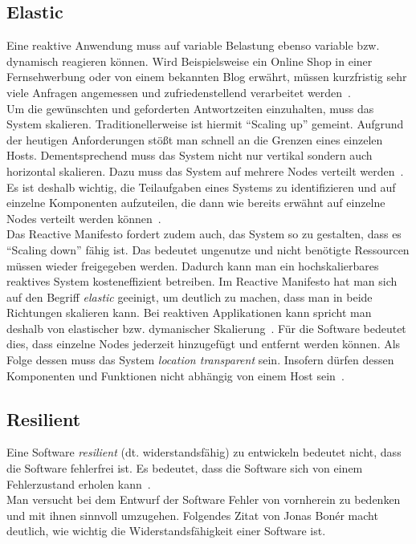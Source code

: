 \subsection{Elastic}\label{subsec:elastic}
Eine reaktive Anwendung muss auf variable Belastung ebenso variable bzw. dynamisch reagieren können. Wird Beispielsweise ein Online Shop in einer Fernsehwerbung oder von einem bekannten Blog erwährt, müssen kurzfristig sehr viele Anfragen angemessen und zufriedenstellend verarbeitet werden~\cite[S.~39]{kuhn_reactive_2015}.\\
Um die gewünschten und geforderten Antwortzeiten einzuhalten, muss das System skalieren. Traditionellerweise ist hiermit \enquote{Scaling up} gemeint. Aufgrund der heutigen Anforderungen stößt man schnell an die Grenzen eines einzelen Hosts. Dementsprechend muss das System nicht nur vertikal sondern auch horizontal skalieren. Dazu muss das System auf mehrere Nodes verteilt werden~\cite[S.~7]{vernon_reactive_2016}. Es ist deshalb wichtig, die Teilaufgaben eines Systems zu identifizieren und auf einzelne Komponenten aufzuteilen, die dann wie bereits erwähnt auf einzelne Nodes verteilt werden können~\cite[S.~40]{kuhn_reactive_2015}.\\
Das Reactive Manifesto fordert zudem auch, das System so zu gestalten, dass es \enquote{Scaling down} fähig ist. Das bedeutet ungenutze und nicht benötigte Ressourcen müssen wieder freigegeben werden. Dadurch kann man ein hochskalierbares reaktives System kosteneffizient betreiben. Im Reactive Manifesto hat man sich auf den Begriff \textit{elastic} geeinigt, um deutlich zu machen, dass man in beide Richtungen skalieren kann. Bei reaktiven Applikationen kann spricht man deshalb von elastischer bzw. dymanischer Skalierung~\cite[S.~8]{vernon_reactive_2016}. Für die Software bedeutet dies, dass einzelne Nodes jederzeit hinzugefügt und entfernt werden können. Als Folge dessen muss das System \textit{location transparent} sein. Insofern dürfen dessen Komponenten und Funktionen nicht abhängig von einem Host sein~\cite[S.~8]{vernon_reactive_2016}. 


\pagebreak

\subsection{Resilient}\label{subsec:resilient}
Eine Software \textit{resilient} (dt. widerstandsfähig) zu entwickeln bedeutet nicht, dass die Software fehlerfrei ist. Es bedeutet, dass die Software sich von einem Fehlerzustand erholen kann~\cite[S.~6]{vernon_reactive_2016}.\\
Man versucht bei dem Entwurf der Software Fehler von vornherein zu bedenken und mit ihnen sinnvoll umzugehen. Folgendes Zitat von Jonas Bonér macht deutlich, wie wichtig die Widerstandsfähigkeit einer Software ist.

